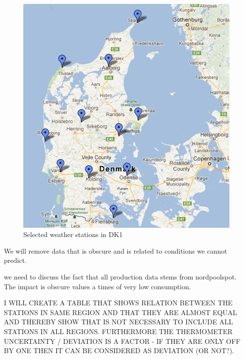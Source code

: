 \begin{figure}[H]
\centering
\includegraphics[width=0.85\linewidth,natwidth=898,natheight=587]{billeder/stations4average.png}
\caption{Selected weather stations in DK1}
\label{fig:stations4average}
\end{figure}

We will remove data that is obscure and is related to conditions we cannot predict. 

we need to discuss the fact that all production data stems from nordpoolspot. The impact is obscure values a times of very low consumption.

I WILL CREATE A TABLE THAT SHOWS RELATION BETWEEN THE STATIONS IN SAME REGION AND THAT THEY ARE ALMOST EQUAL AND THEREBY SHOW THAT IS NOT NECESSARY TO INCLUDE ALL STATIONS IN ALL REGIONS. FURTHERMORE THE THERMOMETER UNCERTAINTY / DEVIATION IS A FACTOR - IF THEY ARE ONLY OFF BY ONE THEN IT CAN BE CONSIDERED AS DEVIATION (OR NOT?).
